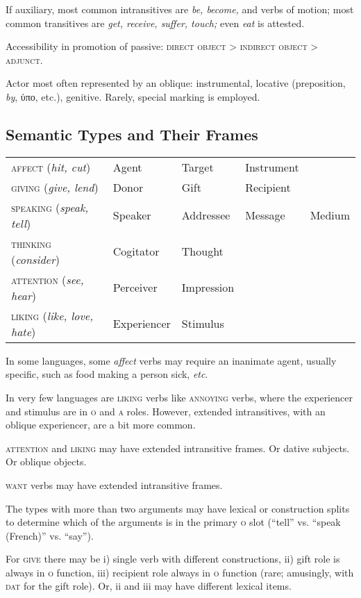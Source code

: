 \documentclass[11pt]{article}
\newcommand{\E}[1]{\textit{#1}}   %
\newcommand{\I}[1]{\textsc{#1}}   %
\begin{document}
If auxiliary, most common intransitives are \textit{be, become,} and
verbs of motion; most common transitives are \textit{get, receive,
suffer, touch;} even \textit{eat} is attested.

Accessibility in promotion of passive: \I{direct object > indirect
object > adjunct}.

Actor most often represented by an oblique: instrumental, locative
(preposition, \textit{by}, ὑπο, etc.), genitive.  Rarely, special
marking is employed.


\subsection{Semantic Types and Their Frames}

\begin{center}
\begin{tabular}{lllll}
\I{affect} (\E{hit, cut}) & Agent & Target & Instrument \\
\I{giving} (\E{give, lend}) & Donor & Gift & Recipient \\
\I{speaking} (\E{speak, tell}) & Speaker & Addressee & Message & Medium \\
\I{thinking} (\E{consider}) & Cogitator & Thought \\
\I{attention} (\E{see, hear}) & Perceiver & Impression \\
\I{liking} (\E{like, love, hate}) & Experiencer & Stimulus
\end{tabular}
\end{center}

In some languages, some \E{affect} verbs may require an inanimate
agent, usually specific, such as food making a person sick,
\textit{etc}.

In very few languages are \I{liking} verbs like \I{annoying} verbs,
where the experiencer and stimulus are in \I{o} and \I{a} roles.
However, extended intransitives, with an oblique experiencer, are a
bit more common.

\I{attention} and \I{liking} may have extended intransitive frames.
Or dative subjects.  Or oblique objects.

\I{want} verbs may have extended intransitive frames.

The types with more than two arguments may have lexical or
construction splits to determine which of the arguments is in the
primary \I{o} slot (``tell'' vs. ``speak (French)'' vs. ``say'').

For \I{give} there may be i) single verb with different constructions,
ii) gift role is always in \I{o} function, iii) recipient role always
in \I{o} function (rare; amusingly, with \I{dat} for the gift role).
Or, ii and iii may have different lexical items.
\end{document}
